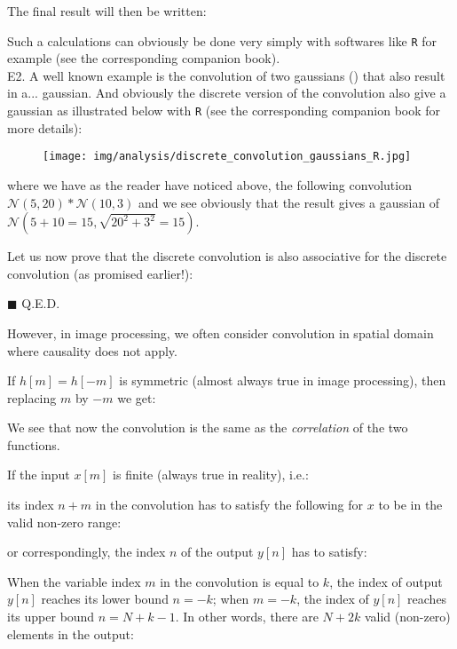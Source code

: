	\begin{tcolorbox}[colframe=black,colback=white,sharp corners]
	
	
	The final result will then be written:
	
	Such a calculations can obviously be done very simply with softwares like \texttt{R} for example (see the corresponding companion book).\\
	
	E2. A well known example is the convolution of two gaussians () that also result in a... gaussian. And obviously the discrete version of the convolution also give a gaussian as illustrated below with \texttt{R} (see the corresponding companion book for more details):
	\begin{figure}[H]
		\centering
		\texttt{[image: img/analysis/discrete\_convolution\_gaussians\_R.jpg]}
	\end{figure}
	where we have as the reader have noticed above, the following convolution $\mathcal{N}(5,20)*\mathcal{N}(10,3)$ and we see obviously that the result gives a gaussian of $\mathcal{N}(5+10=15,\sqrt{20^2+3^2}=15)$.
	\end{tcolorbox}
	Let us now prove that the discrete convolution is also associative for the discrete convolution (as promised earlier!):
	\begin{dem}
	
	\begin{flushright}
		$\blacksquare$  Q.E.D.
	\end{flushright}
	\end{dem}
	However, in image processing, we often consider convolution in spatial domain where causality does not apply.
	
	If $h[m]=h[-m]$ is symmetric (almost always true in image processing),
	then replacing $m$ by $-m$ we get:
	
	We see that now the convolution is the same as the {\em correlation} of the two functions. 
	
	If the input $x[m]$ is finite (always true in reality), i.e.:
	
	its index $n+m$ in the convolution has to satisfy the following for $x$ to be in the valid non-zero range:
		
	or correspondingly, the index $n$ of the output $y[n]$ has to satisfy:
	
	When the variable index $m$ in the convolution is equal to $k$, the 
	index of output $y[n]$ reaches its lower bound $n=-k$; when $m=-k$, 
	the index of $y[n]$ reaches its upper bound $n=N+k-1$. In other words,
	there are $N+2k$ valid (non-zero) elements in the output:
	
